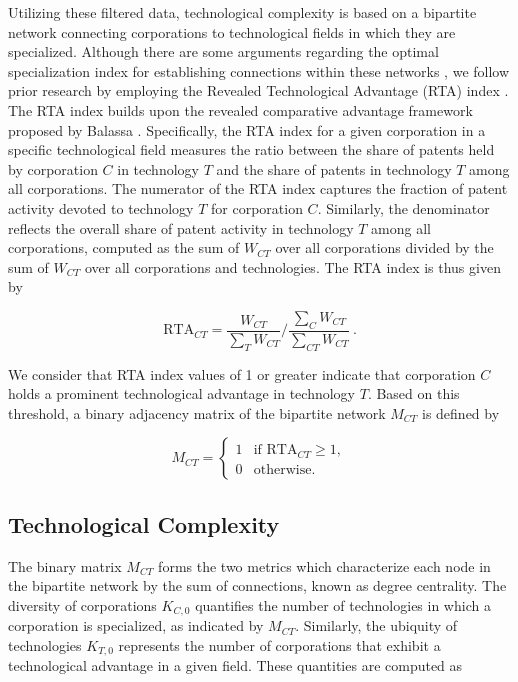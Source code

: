 \documentclass[lineno,pdflatex,sn-mathphys-num]{sn-jnl}%
\theoremstyle{thmstyleone}%
\theoremstyle{thmstyletwo}%
\theoremstyle{thmstylethree}%
\begin{document}
Utilizing these filtered data, technological complexity is based on a bipartite network connecting corporations to technological fields in which they are specialized. Although there are some arguments regarding the optimal specialization index for establishing connections within these networks \cite{PintarScherngell2022}, we follow prior research by employing the Revealed Technological Advantage (RTA) index \cite{Soete1987}.
The RTA index builds upon the revealed comparative advantage framework proposed by Balassa \cite{Balassa1965}.
Specifically, the RTA index for a given corporation in a specific technological field measures the ratio between the share of patents held by corporation \(C\) in technology \(T\) and the share of patents in technology \(T\) among all corporations.
The numerator of the RTA index captures the fraction of patent activity devoted to technology \(T\) for corporation \(C\).
Similarly, the denominator reflects the overall share of patent activity in technology \(T\) among all corporations, computed as the sum of \(W_{CT}\) over all corporations divided by the sum of \(W_{CT}\) over all corporations and technologies.
The RTA index is thus given by

\begin{equation}\label{eq1}
\mbox{RTA}_{CT} = \frac{W_{CT}}{\sum_{T} W_{CT}} \Bigg/ \frac{\sum_{C} W_{CT}}{\sum_{CT} W_{CT}}~.
\end{equation}

We consider that RTA index values of 1 or greater indicate that corporation \(C\) holds a prominent technological advantage in technology \(T\). Based on this threshold, a binary adjacency matrix of the bipartite network \(M_{CT}\) is defined by

\begin{equation}\label{eq2}
M_{CT} =
\begin{cases}
1 & \text{if } \mbox{RTA}_{CT} \geq 1, \\
0 & \text{otherwise}.
\end{cases}
\end{equation}

\subsection{Technological Complexity}\label{subsection:technologicalcomplexity}

The binary matrix \(M_{CT}\) forms the two metrics which characterize each node in the bipartite network by the sum of connections, known as degree centrality. The diversity of corporations \(K_{C,0}\) quantifies the number of technologies in which a corporation is specialized, as indicated by $M_{CT}$.
Similarly, the ubiquity of technologies \(K_{T,0}\) represents the number of corporations that exhibit a technological advantage in a given field. These quantities are computed as
\end{document}
